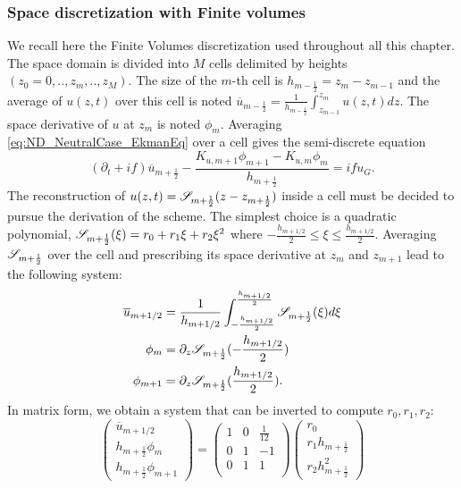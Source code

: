 \subsubsection{Space discretization with Finite volumes}
We recall here the Finite Volumes discretization used throughout
all this chapter.
The space domain is divided into $M$ cells delimited by
heights $(z_0=0, .., z_m, .., z_M)$. The size of the $m$-th cell
is $h_{m-\frac{1}{2}}=z_{m}-z_{m-1}$ and the average of $u(z, t)$
over this cell is noted
$\overline{u}_{m-\frac{1}{2}}=\frac{1} {h_{m-\frac{1}{2}}}
\int_{z_{m-1}}^{z_m}u(z, t)dz$.
The space derivative of $u$ at $z_m$ is noted $\phi_{m}$.
Averaging \eqref{eq:ND_NeutralCase_EkmanEq} over a cell gives
the semi-discrete equation
\begin{equation}
\label{eq:ND_NeutralCase_semiDiscreteEkmanEq}
	(\partial_t + if) \overline{u}_{m+\frac{1}{2}} - 
	\frac{K_{u, m+1} \phi_{m+1} - K_{u, m} \phi_{m}}
		{h_{m+\frac{1}{2}}} = i f u_G.
\end{equation}
The reconstruction of $u(z, t) = {\cal S}_{m+\frac{1}{2}}
				(z - z_{m+\frac{1}{2}})$
				inside a cell must be decided
to pursue the derivation of the scheme. The simplest choice is
a quadratic polynomial,
${\cal S}_{m+\frac{1}{2}}(\xi) = r_0 + r_1 \xi + r_2 \xi^2$ where
$-\frac{h_{m+1/2}}{2} \leq \xi \leq \frac{h_{m+1/2}}{2}$.
Averaging ${\cal S}_{m+\frac{1}{2}}$ over the cell and
prescribing its space derivative at $z_{m}$ and $z_{m+1}$
lead to the following system:
\begin{equation}
	\begin{aligned}
		\overline{u}_{m+1/2} &= \frac{1}{h_{m+1/2}}
		\int_{-\frac{h_{m+1/2}}{2}}^{\frac{h_{m+1/2}}{2}}
		{\cal S}_{m+\frac{1}{2}}(\xi)d\xi\\
		\phi_m &= \partial_z {\cal S}_{m+\frac{1}{2}}
		(-\frac{h_{m+1/2}}{2})\\
		\phi_{m+1} &=
		\partial_z {\cal S}_{m+\frac{1}{2}}
		(\frac{h_{m+1/2}}{2}).
	\end{aligned}
\end{equation}
In matrix form, we obtain a system that can be inverted to
compute $r_0, r_1, r_2$:
\begin{equation}
    \begin{pmatrix}
    \overline{u}_{m+1/2} \\
    h_{m+\frac{1}{2}} \phi_m \\
	    h_{m+\frac{1}{2}} \phi_{m+1}
    \end{pmatrix} = 
    \begin{pmatrix}
    1 & 0 & \frac{1}{12} \\
    0 & 1 & -1 \\
    0 & 1 & 1 \\
    \end{pmatrix}
    \begin{pmatrix}
    r_0 \\
    r_1 h_{m+\frac{1}{2}} \\
    r_2 h_{m+\frac{1}{2}}^2
    \end{pmatrix}
\end{equation}
